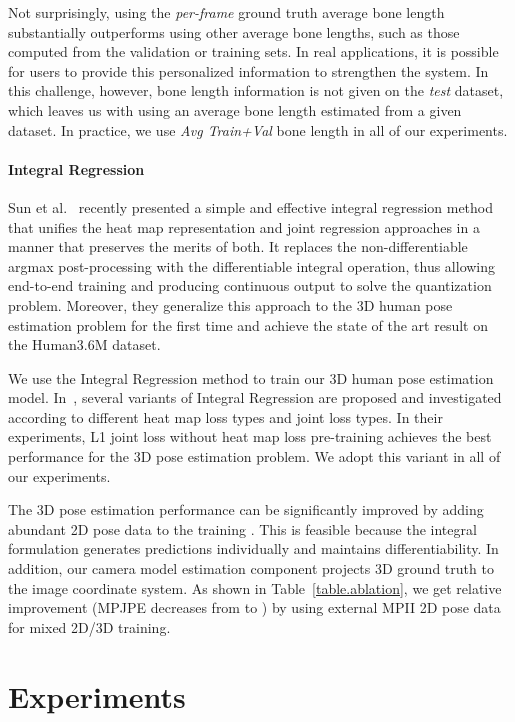 \documentclass[runningheads]{llncs}
\begin{document}
Not surprisingly, using the \emph{per-frame} ground truth average bone length substantially outperforms using other average bone lengths, such as those computed from the validation or training sets. In real applications, it is possible for users to provide this personalized information to strengthen the system. In this challenge, however, bone length information is not given on the \emph{test} dataset, which leaves us with using an average bone length estimated from a given dataset. In practice, we use \emph{Avg Train+Val} bone length in all of our experiments.

\paragraph{\textbf{Integral Regression}} Sun et al.~\cite{sun2017integral} recently presented a simple and effective integral regression method that unifies the heat map representation and joint regression approaches in a manner that preserves the merits of both. It replaces the non-differentiable argmax post-processing with the differentiable integral operation, thus allowing end-to-end training and producing continuous output to solve the quantization problem. Moreover, they generalize this approach to the 3D human pose estimation problem for the first time and achieve the state of the art result on the Human3.6M dataset.

We use the Integral Regression method to train our 3D human pose estimation model. In~\cite{sun2017integral}, several variants of Integral Regression are proposed and investigated according to different heat map loss types and joint loss types. In their experiments, L1 joint loss without heat map loss pre-training achieves the best performance for the 3D pose estimation problem. We adopt this variant in all of our experiments. 

The 3D pose estimation performance can be significantly improved by adding abundant 2D pose data to the training \cite{sun2017integral,sun2017compositional}. This is feasible because the integral formulation generates  predictions individually and maintains differentiability. In addition, our camera model estimation component projects 3D ground truth to the image coordinate system. As shown in Table~\ref{table.ablation}, we get  relative improvement (MPJPE decreases from  to ) by using external MPII 2D pose data for mixed 2D/3D training.

\section{Experiments}
\label{sec.imp}
\end{document}
